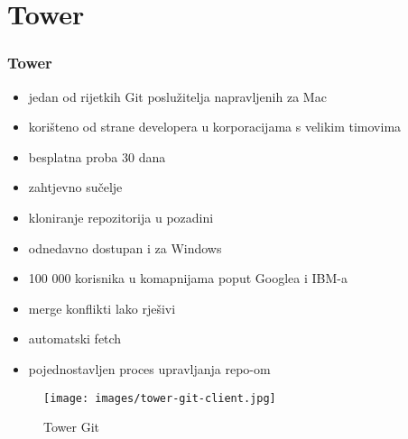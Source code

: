 \section{Tower}
\begin{frame}[allowframebreaks]
\frametitle{Tower}
 
\begin{itemize}
 \item jedan od rijetkih Git poslužitelja napravljenih za Mac
 \item korišteno od strane developera u korporacijama s velikim timovima
 \item besplatna proba 30 dana
 \item zahtjevno sučelje
 \item kloniranje repozitorija u pozadini
 \item odnedavno dostupan i za Windows
 \framebreak
 \item 100 000 korisnika u komapnijama poput Googlea i IBM-a
 \item merge konflikti lako rješivi
 \item automatski fetch
 \item pojednostavljen proces upravljanja repo-om
\end{itemize}


\end{frame}

\begin{figure}
	\texttt{[image: images/tower-git-client.jpg]}
	\caption{Tower Git}
\end{figure}
